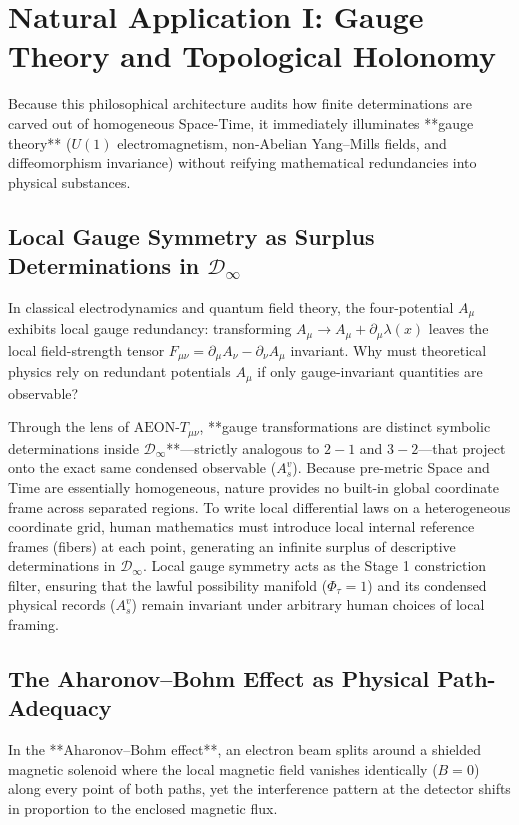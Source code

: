 \documentclass[11pt,a4paper]{article}
\begin{document}
\section{Natural Application I: Gauge Theory and Topological Holonomy}

Because this philosophical architecture audits how finite determinations are carved out of homogeneous Space-Time, it immediately illuminates **gauge theory** ($U(1)$ electromagnetism, non-Abelian Yang--Mills fields, and diffeomorphism invariance) without reifying mathematical redundancies into physical substances.

\subsection{Local Gauge Symmetry as Surplus Determinations in $\mathcal{D}_\infty$}

In classical electrodynamics and quantum field theory, the four-potential $A_\mu$ exhibits local gauge redundancy: transforming $A_\mu \to A_\mu + \partial_\mu \lambda(x)$ leaves the local field-strength tensor $F_{\mu\nu} = \partial_\mu A_\nu - \partial_\nu A_\mu$ invariant. Why must theoretical physics rely on redundant potentials $A_\mu$ if only gauge-invariant quantities are observable?

Through the lens of $\text{AEON-}T_{\mu\nu}$, **gauge transformations are distinct symbolic determinations inside $\mathcal{D}_\infty$**—strictly analogous to $2 - 1$ and $3 - 2$—that project onto the exact same condensed observable ($A_s^v$). Because pre-metric Space and Time are essentially homogeneous, nature provides no built-in global coordinate frame across separated regions. To write local differential laws on a heterogeneous coordinate grid, human mathematics must introduce local internal reference frames (fibers) at each point, generating an infinite surplus of descriptive determinations in $\mathcal{D}_\infty$. Local gauge symmetry acts as the Stage 1 constriction filter, ensuring that the lawful possibility manifold ($\Phi_\tau = 1$) and its condensed physical records ($A_s^v$) remain invariant under arbitrary human choices of local framing.

\subsection{The Aharonov--Bohm Effect as Physical Path-Adequacy}

In the **Aharonov--Bohm effect**, an electron beam splits around a shielded magnetic solenoid where the local magnetic field vanishes identically ($B = 0$) along every point of both paths, yet the interference pattern at the detector shifts in proportion to the enclosed magnetic flux.
\end{document}
